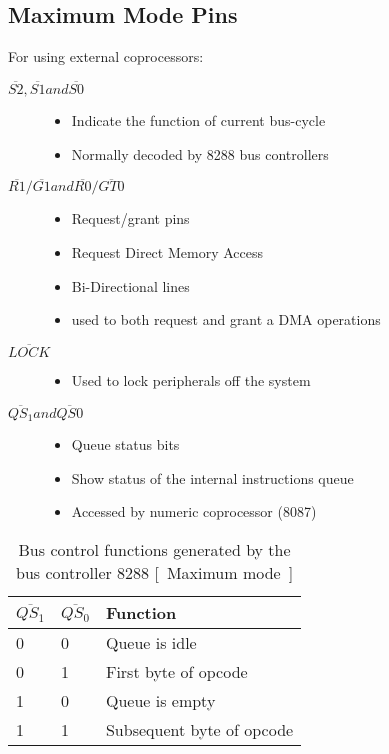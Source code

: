 \documentclass{article}
\begin{document}
\subsection{Maximum Mode Pins}
For using external coprocessors:
\begin{description}

    \item[$\overline{S2} , \overline{S1} and \overline{S0} $]
    \begin{itemize}
        \item Indicate the function of current bus-cycle
        \item Normally decoded by 8288 bus controllers
    \end{itemize}

    \item[$\overline{R1} / \overline{G1} and \overline{R0} / \overline{GT0} $]
    \begin{itemize}
        \item Request/grant pins
        \item Request Direct Memory Access
        \item Bi-Directional lines
        \item used to both request and grant a DMA operations
    \end{itemize}

    \item[$\overline{LOCK} $]
    \begin{itemize}
        \item Used to lock peripherals off the system
    \end{itemize}

    \item[$\overline{QS_1}  and \overline{QS0} $]
    \begin{itemize}
        \item Queue status bits
        \item Show status of the internal instructions queue
        \item Accessed by numeric coprocessor (8087)
    \end{itemize}

\end{description}

\begin{table}[h!]
\centering
\begin{tabular}{ |p{1cm}|p{1cm}|p{3cm}|  }
\hline
$ \overline{QS_1} $ & $ \overline{QS_0} $  & Function   \\
\hline
0 & 0 & Queue is idle \\
0 & 1 & First byte of opcode \\
1 & 0 & Queue is empty\\
1 & 1 & Subsequent byte of opcode \\
\hline
\end{tabular}

\caption{Bus control functions generated by the bus controller 8288 [~Maximum mode~]}
\label{table:2}
\end{table}
\end{document}
